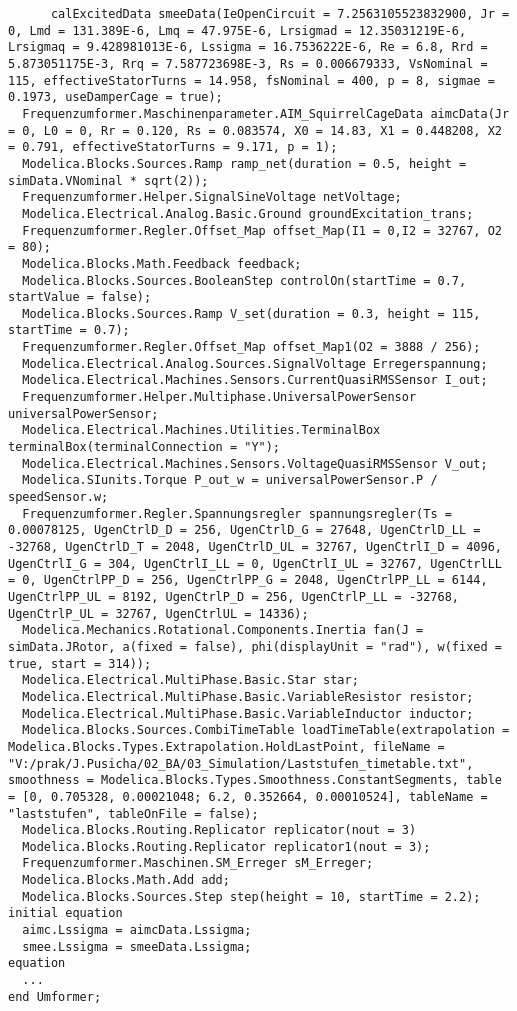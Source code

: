 \begin{verbatim}
      calExcitedData smeeData(IeOpenCircuit = 7.2563105523832900, Jr = 0, Lmd = 131.389E-6, Lmq = 47.975E-6, Lrsigmad = 12.35031219E-6, Lrsigmaq = 9.428981013E-6, Lssigma = 16.7536222E-6, Re = 6.8, Rrd = 5.873051175E-3, Rrq = 7.587723698E-3, Rs = 0.006679333, VsNominal = 115, effectiveStatorTurns = 14.958, fsNominal = 400, p = 8, sigmae = 0.1973, useDamperCage = true);
  Frequenzumformer.Maschinenparameter.AIM_SquirrelCageData aimcData(Jr = 0, L0 = 0, Rr = 0.120, Rs = 0.083574, X0 = 14.83, X1 = 0.448208, X2 = 0.791, effectiveStatorTurns = 9.171, p = 1);
  Modelica.Blocks.Sources.Ramp ramp_net(duration = 0.5, height = simData.VNominal * sqrt(2));
  Frequenzumformer.Helper.SignalSineVoltage netVoltage;
  Modelica.Electrical.Analog.Basic.Ground groundExcitation_trans;
  Frequenzumformer.Regler.Offset_Map offset_Map(I1 = 0,I2 = 32767, O2 = 80);
  Modelica.Blocks.Math.Feedback feedback;
  Modelica.Blocks.Sources.BooleanStep controlOn(startTime = 0.7, startValue = false);
  Modelica.Blocks.Sources.Ramp V_set(duration = 0.3, height = 115, startTime = 0.7);
  Frequenzumformer.Regler.Offset_Map offset_Map1(O2 = 3888 / 256);
  Modelica.Electrical.Analog.Sources.SignalVoltage Erregerspannung;
  Modelica.Electrical.Machines.Sensors.CurrentQuasiRMSSensor I_out;
  Frequenzumformer.Helper.Multiphase.UniversalPowerSensor universalPowerSensor;
  Modelica.Electrical.Machines.Utilities.TerminalBox terminalBox(terminalConnection = "Y");
  Modelica.Electrical.Machines.Sensors.VoltageQuasiRMSSensor V_out;
  Modelica.SIunits.Torque P_out_w = universalPowerSensor.P / speedSensor.w;
  Frequenzumformer.Regler.Spannungsregler spannungsregler(Ts = 0.00078125, UgenCtrlD_D = 256, UgenCtrlD_G = 27648, UgenCtrlD_LL = -32768, UgenCtrlD_T = 2048, UgenCtrlD_UL = 32767, UgenCtrlI_D = 4096, UgenCtrlI_G = 304, UgenCtrlI_LL = 0, UgenCtrlI_UL = 32767, UgenCtrlLL = 0, UgenCtrlPP_D = 256, UgenCtrlPP_G = 2048, UgenCtrlPP_LL = 6144, UgenCtrlPP_UL = 8192, UgenCtrlP_D = 256, UgenCtrlP_LL = -32768, UgenCtrlP_UL = 32767, UgenCtrlUL = 14336);
  Modelica.Mechanics.Rotational.Components.Inertia fan(J = simData.JRotor, a(fixed = false), phi(displayUnit = "rad"), w(fixed = true, start = 314));
  Modelica.Electrical.MultiPhase.Basic.Star star;
  Modelica.Electrical.MultiPhase.Basic.VariableResistor resistor;
  Modelica.Electrical.MultiPhase.Basic.VariableInductor inductor;
  Modelica.Blocks.Sources.CombiTimeTable loadTimeTable(extrapolation = Modelica.Blocks.Types.Extrapolation.HoldLastPoint, fileName = "V:/prak/J.Pusicha/02_BA/03_Simulation/Laststufen_timetable.txt", smoothness = Modelica.Blocks.Types.Smoothness.ConstantSegments, table = [0, 0.705328, 0.00021048; 6.2, 0.352664, 0.00010524], tableName = "laststufen", tableOnFile = false);
  Modelica.Blocks.Routing.Replicator replicator(nout = 3)
  Modelica.Blocks.Routing.Replicator replicator1(nout = 3);
  Frequenzumformer.Maschinen.SM_Erreger sM_Erreger;
  Modelica.Blocks.Math.Add add;
  Modelica.Blocks.Sources.Step step(height = 10, startTime = 2.2);  
initial equation
  aimc.Lssigma = aimcData.Lssigma;
  smee.Lssigma = smeeData.Lssigma;
equation
  ...
end Umformer;
\end{verbatim}
\endgroup

